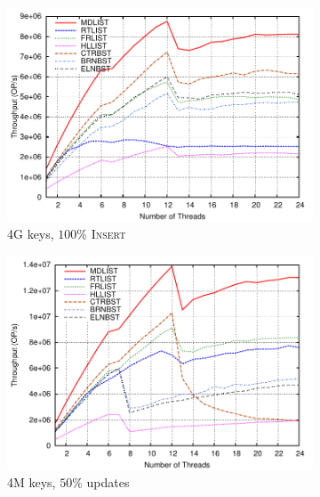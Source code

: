 \documentclass[10pt,conference,compsocconf]{IEEEtran}
\begin{document}
\begin{figure}[t]
    \begin{subfigure}{0.32\textwidth}
        \centering
        \includegraphics[width=1\columnwidth]{./data/intel100ins4Bkey}
        \caption{4G keys, $100\%$ \textsc{Insert}}
        \label{fig:4g100ins}
    \end{subfigure}
    \hfill
    \begin{subfigure}{0.32\textwidth}
        \centering
        \includegraphics[width=1\columnwidth]{./data/intel30ins4Mkey}
        \caption{4M keys, $50\%$ updates}
        \label{fig:4m30ins}
    \end{subfigure}
    \hfill
    \begin{subfigure}{0.32\textwidth}
        \centering

\end{subfigure}
\end{figure}
\end{document}
